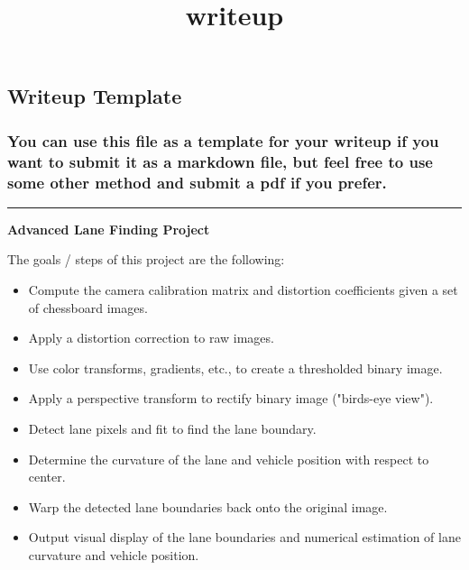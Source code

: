 \documentclass[11pt]{article}
\title{writeup}
\providecommand{\tightlist}{%
      \setlength{\itemsep}{0pt}\setlength{\parskip}{0pt}}
\begin{document}
    
    
    \maketitle
    
    

    
    \subsection{Writeup Template}\label{writeup-template}

\subsubsection{You can use this file as a template for your writeup if
you want to submit it as a markdown file, but feel free to use some
other method and submit a pdf if you
prefer.}\label{you-can-use-this-file-as-a-template-for-your-writeup-if-you-want-to-submit-it-as-a-markdown-file-but-feel-free-to-use-some-other-method-and-submit-a-pdf-if-you-prefer.}

\begin{center}\rule{0.5\linewidth}{\linethickness}\end{center}

\textbf{Advanced Lane Finding Project}

The goals / steps of this project are the following:

\begin{itemize}
\tightlist
\item
  Compute the camera calibration matrix and distortion coefficients
  given a set of chessboard images.
\item
  Apply a distortion correction to raw images.
\item
  Use color transforms, gradients, etc., to create a thresholded binary
  image.
\item
  Apply a perspective transform to rectify binary image ("birds-eye
  view").
\item
  Detect lane pixels and fit to find the lane boundary.
\item
  Determine the curvature of the lane and vehicle position with respect
  to center.
\item
  Warp the detected lane boundaries back onto the original image.
\item
  Output visual display of the lane boundaries and numerical estimation
  of lane curvature and vehicle position.
\end{itemize}
\end{document}
